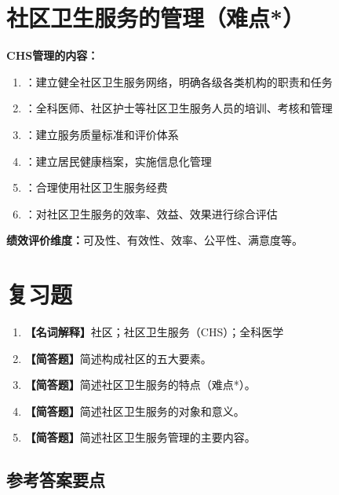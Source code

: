 \section{社区卫生服务的管理（难点*）}

\begin{defbox}
\textbf{CHS管理的内容：}
\begin{enumerate}[leftmargin=*]
    \item {}：建立健全社区卫生服务网络，明确各级各类机构的职责和任务
    \item {}：全科医师、社区护士等社区卫生服务人员的培训、考核和管理
    \item {}：建立服务质量标准和评价体系
    \item {}：建立居民健康档案，实施信息化管理
    \item {}：合理使用社区卫生服务经费
    \item {}：对社区卫生服务的效率、效益、效果进行综合评估
\end{enumerate}

\textbf{绩效评价维度：}可及性、有效性、效率、公平性、满意度等。
\end{defbox}

\section{复习题}

\begin{enumerate}[leftmargin=*, itemsep=8pt]
    \item \textbf{【名词解释】}社区；社区卫生服务（CHS）；全科医学
    \item \textbf{【简答题】}简述构成社区的五大要素。
    \item \textbf{【简答题】}简述社区卫生服务的特点（难点*）。
    \item \textbf{【简答题】}简述社区卫生服务的对象和意义。
    \item \textbf{【简答题】}简述社区卫生服务管理的主要内容。
\end{enumerate}

\subsection*{参考答案要点}

